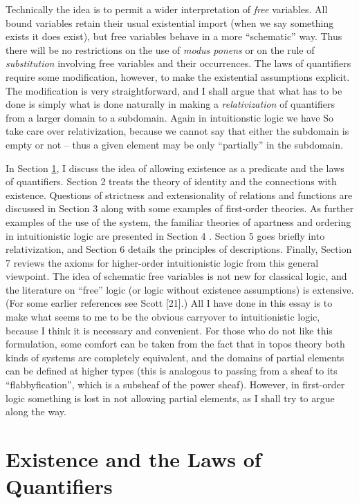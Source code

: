 Technically the idea is to permit a wider interpretation of {\it free} variables.
All bound variables retain their usual existential import (when we say something exists it does exist), but free variables behave in a more ``schematic'' way. Thus there will be no restrictions on the use of {\it modus ponens} or on the rule of {\it substitution} involving free variables and their occurrences. The laws of quantifiers require some modification, however, to make the existential assumptions explicit. The modification is very straightforward, and I shall argue that what has to be done is
simply what is done naturally in making a {\it relativization} of quantifiers from a
larger domain to a subdomain. Again in intuitionstic logic we have So take care over relativization, because we cannot say that either the subdomain is empty or not -- thus a given element may be only ``partially'' in the subdomain.

In Section \ref{sec1}, I discuss the idea of allowing existence as a predicate and
the laws of quantifiers. Section 2 treats the theory of identity and the connections with existence. Questions of strictness and extensionality of relations and functions are discussed in Section 3 along with some examples of first-order theories. As further examples of the use of the system, the familiar theories of apartness and ordering in intuitionistic logic are presented in Section 4 . Section 5 goes briefly into relativization, and Section 6 details the principles of descriptions. Finally, Section 7 reviews the axioms for higher-order intuitionistic logic from this general viewpoint.
The idea of schematic free variables is not new for classical logic, and the literature on ``free'' logic (or logic without existence assumptions) is extensive.
(For some earlier references see Scott [21].) All I have done in this essay is
to make what seems to me to be the obvious carryover to intuitionistic logic,
because I think it is necessary and convenient. For those who do not like this formulation, some comfort can be taken from the fact that in topos theory both kinds of systems are completely equivalent, and the domains of partial elements can be defined at higher types (this is analogous to passing from a sheaf to its ``flabbyfication'', which is a subsheaf of the power sheaf). However, in first-order logic something is lost in not allowing partial elements, as I shall try to argue along
the way.

\section{Existence and the Laws of Quantifiers}\label{sec1}

